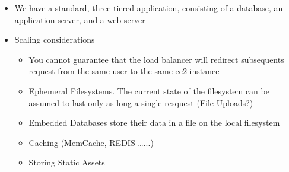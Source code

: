 \documentclass{beamer}
\begin{document}
\begin{frame}
\begin{itemize}
 \item We have a standard, three-tiered application, consisting of a database, an application server, and a web server
 \item Scaling considerations
 \begin{itemize}
   \item You cannot guarantee that the load balancer will redirect subsequents request from the same user to the same \acrshort{ec2} instance
   \item Ephemeral Filesystems. The current state of the filesystem can be assumed to last only as long a single resquest (File Uploads?)
   \item Embedded Databases store their data in a file on the local filesystem
   \item Caching (MemCache, REDIS \dots...)
   \item Storing Static Assets
 \end{itemize}
\end{itemize}


\end{frame}
\end{document}
